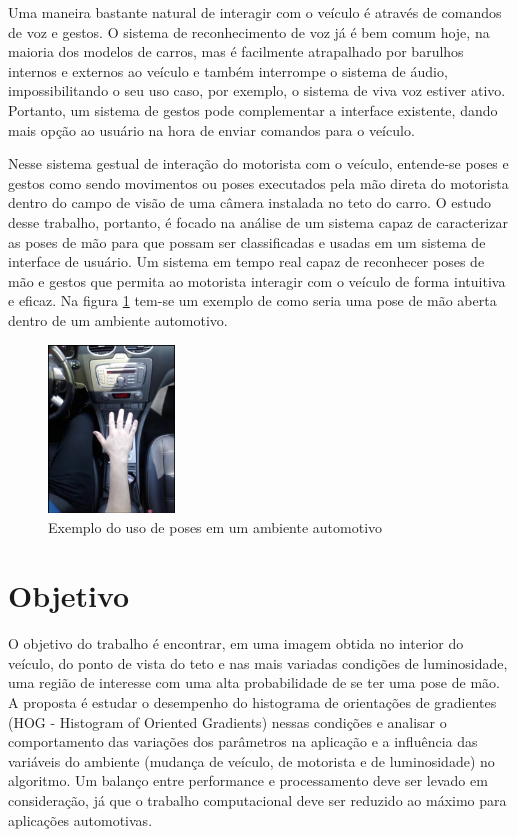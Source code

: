 Uma maneira bastante natural de interagir com o veículo é através de comandos de voz e gestos. O sistema de reconhecimento de voz já é bem comum hoje, na maioria dos modelos de carros, mas é facilmente atrapalhado por barulhos internos e externos ao veículo e também interrompe o sistema de áudio, impossibilitando o seu uso caso, por exemplo, o sistema de viva voz estiver ativo. Portanto, um sistema de gestos pode complementar a interface existente, dando mais opção ao usuário na hora de enviar comandos para o veículo.

Nesse sistema gestual de interação do motorista com o veículo, entende-se poses e gestos como sendo movimentos ou poses executados pela mão direta do motorista dentro do campo de visão de uma câmera instalada no teto do carro.
O estudo desse trabalho, portanto, é focado na análise de um sistema capaz de caracterizar as poses de mão para que possam ser classificadas e usadas em um sistema de interface de usuário. Um sistema em tempo real capaz de reconhecer poses de mão e gestos que permita ao motorista interagir com o veículo de forma intuitiva e eficaz. Na figura \ref{fig:visao_aplicacao} tem-se um exemplo de como seria uma pose de mão aberta dentro de um ambiente automotivo.

\begin{figure}[ht!]
	\centering
	\includegraphics[width=0.3\textwidth]{image/exemplo_visao_aplicacao.png}
	\caption{Exemplo do uso de poses em um ambiente automotivo}
	\label{fig:visao_aplicacao}
\end{figure}

\section{Objetivo}

O objetivo do trabalho é encontrar, em uma imagem obtida no interior do veículo, do ponto de vista do teto e nas mais variadas condições de luminosidade, uma região de interesse com uma alta probabilidade de se ter uma pose de mão. A proposta é estudar o desempenho do histograma de orientações de gradientes (HOG - Histogram of Oriented Gradients) nessas condições e analisar o comportamento das variações dos parâmetros na aplicação e a influência das variáveis do ambiente (mudança de veículo, de motorista e de luminosidade) no algoritmo.
Um balanço entre performance e processamento deve ser levado em consideração, já que o trabalho computacional deve ser reduzido ao máximo para aplicações automotivas.

